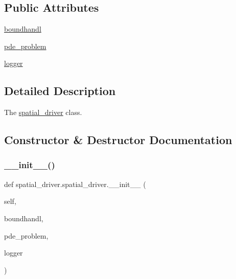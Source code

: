 \subsection*{Public Attributes}
\begin{DoxyCompactItemize}
\item 
\hyperlink{classspatial__driver_1_1spatial__driver_aeb66b87c7c18067c8a9a16b47bcbbd2f}{boundhandl}
\item 
\hyperlink{classspatial__driver_1_1spatial__driver_a22bfac114fe305ab4089d9ce0e71c678}{pde\+\_\+problem}
\item 
\hyperlink{classspatial__driver_1_1spatial__driver_a5d9fcdf9d8185cb89fb1941038cfbbc8}{logger}
\end{DoxyCompactItemize}


\subsection{Detailed Description}
The \hyperlink{classspatial__driver_1_1spatial__driver}{spatial\+\_\+driver} class. 

\subsection{Constructor \& Destructor Documentation}
\mbox{\label{classspatial__driver_1_1spatial__driver_a6574f876678eb408a66e7a64422a8a65}} 
\subsubsection{\texorpdfstring{\+\_\+\+\_\+init\+\_\+\+\_\+()}{\_\_init\_\_()}}
{\footnotesize\ttfamily def spatial\+\_\+driver.\+spatial\+\_\+driver.\+\_\+\+\_\+init\+\_\+\+\_\+ (\begin{DoxyParamCaption}\item[{}]{self,  }\item[{}]{boundhandl,  }\item[{}]{pde\+\_\+problem,  }\item[{}]{logger }\end{DoxyParamCaption})}




